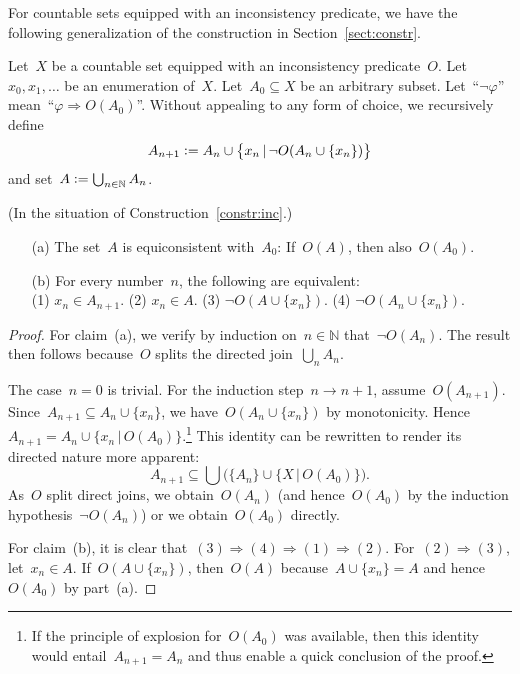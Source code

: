 \documentclass[envcountsect,envcountsame,runningheads]{llncs}
\newcommand{\NN}{\mathbb{N}}
\newcommand{\defeq}{\vcentcolon=}
\renewcommand{\_}{\mathpunct{.}\,}
\begin{document}
For countable sets equipped with an inconsistency predicate, we have the
following generalization of the construction in Section~\ref{sect:constr}.

\begin{construction}\label{constr:inc}Let~$X$ be a countable set equipped with
an inconsistency predicate~$O$. Let~$x_0,x_1,\ldots$ be an enumeration of~$X$.
Let~$A_0 \subseteq X$ be an arbitrary subset. Let~``$\neg\varphi$''
mean~``$\varphi \Rightarrow O(A_0)$''. Without appealing to any form of choice,
we recursively define
\[ A_{n+1} \defeq A_n \cup \bigl\{ x_n \,|\, \neg O(A_n\cup\{x_n\}) \bigr\} \]
and set~$A \defeq \bigcup_{n \in \NN} A_n$.
\end{construction}

\begin{lemma}\label{lemma:omnibus-inc}(In the situation of
Construction~\ref{constr:inc}.)
\begin{enumerate}
\item[(a)] The set~$A$ is equiconsistent with~$A_0$: If~$O(A)$, then also~$O(A_0)$.
\item[(b)] For every number~$n$, the following are equivalent: \\
(1) $x_n \in A_{n+1}$. \quad
(2) $x_n \in A$. \quad
(3) $\neg O(A\cup\{x_n\})$. \quad
(4) $\neg O(A_n \cup \{x_n\})$.
\end{enumerate}\end{lemma}

\begin{proof}For claim~(a), we verify by induction on~$n \in \NN$ that~$\neg
O(A_n)$. The result then follows because~$O$ splits the directed join~$\bigcup_n A_n$.

The case~$n = 0$ is trivial. For the induction step~$n \to n+1$,
assume~$O(A_{n+1})$. Since~$A_{n+1} \subseteq A_n \cup \{x_n\}$, we have~$O(A_n
\cup \{ x_n \})$ by monotonicity. Hence~$A_{n+1} = A_n \cup \{ x_n \,|\, O(A_0)
\}$.\footnote{If the principle of explosion for~$O(A_0)$ was available, then
this identity would entail~$A_{n+1} = A_n$ and thus enable a quick conclusion
of the proof.} This identity can be rewritten to render its directed nature
more apparent:
\[ A_{n+1} \subseteq \bigcup \bigl(\{A_n\} \cup \{X \,|\, O(A_0)\}\bigr). \]
As~$O$ split direct joins, we obtain~$O(A_n)$ (and hence~$O(A_0)$ by the
induction hypothesis~$\neg O(A_n)$) or we obtain~$O(A_0)$ directly.

For claim~(b), it is clear that~$(3) \Rightarrow (4) \Rightarrow (1) \Rightarrow
(2)$. For~$(2) \Rightarrow (3)$, let~$x_n \in A$.
If~$O(A\cup\{x_n\})$, then~$O(A)$ because~$A\cup\{x_n\}=A$ and hence~$O(A_0)$
by part~(a).
\end{proof}
\end{document}
